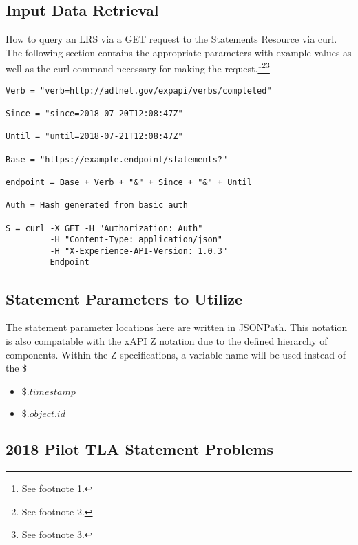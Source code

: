 \documentclass{article}
\begin{document}
\subsection{Input Data Retrieval}

How to query an LRS via a GET request to the Statements Resource via
curl. The following section contains the appropriate parameters with
example values as well as the curl command necessary for making the
request.\footnote{\label{refMoreLink2} See footnote
  1.}\footnote{\label{refnoZ2} See footnote
  2.}\footnote{\label{refallTime2} See footnote 3.}

\begin{lstlisting}[frame=single]
Verb = "verb=http://adlnet.gov/expapi/verbs/completed"

Since = "since=2018-07-20T12:08:47Z"

Until = "until=2018-07-21T12:08:47Z"

Base = "https://example.endpoint/statements?"

endpoint = Base + Verb + "&" + Since + "&" + Until

Auth = Hash generated from basic auth

S = curl -X GET -H "Authorization: Auth"
         -H "Content-Type: application/json"
         -H "X-Experience-API-Version: 1.0.3"
         Endpoint
\end{lstlisting}

\subsection{Statement Parameters to Utilize}

The statement parameter locations here are written in
\href{http://goessner.net/articles/JsonPath/}{JSONPath}. This notation
is also compatable with the xAPI Z notation due to the defined
hierarchy of components. Within the Z specifications, a variable name
will be used instead of the $\$$
\begin{itemize}
\item $\$.timestamp$
\item $\$.object.id$
\end{itemize}

\subsection{2018 Pilot TLA Statement Problems}
\end{document}
